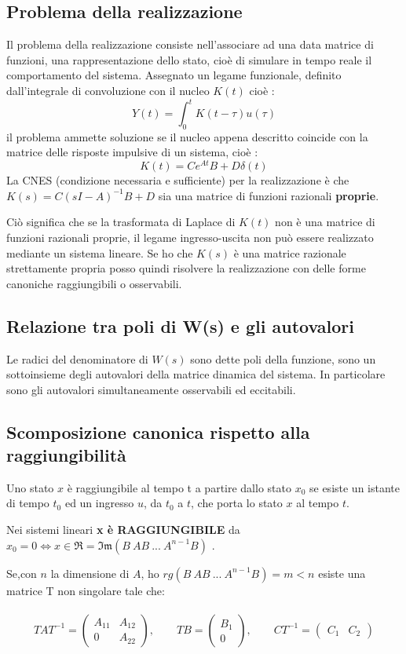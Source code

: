 \documentclass{article}
\begin{document}
\subsection{Problema della realizzazione}
Il problema della realizzazione consiste nell'associare ad una data matrice di funzioni,
una rappresentazione dello stato, cioè di simulare in tempo reale il comportamento del sistema.
Assegnato un legame funzionale, definito dall'integrale di convoluzione con il nucleo $K(t)$ cioè :
\[ Y(t)=\int_{0}^{t}K(t-\tau)u(\tau) \]
il problema ammette soluzione se il nucleo appena descritto coincide con la matrice delle risposte impulsive di un sistema, cioè :
\[ K(t)=Ce^{At}B+D\delta(t) \]
La CNES (condizione necessaria e sufficiente) per la realizzazione è che $K(s)=C(sI-A)^{-1}B+D$ sia una matrice di funzioni razionali \textbf{proprie}.

Ciò significa che se la trasformata di Laplace di $K(t)$ non è una matrice di funzioni razionali proprie,
il legame ingresso-uscita non può essere realizzato mediante un sistema lineare.
Se ho che $K(s)$ è una matrice razionale strettamente propria posso quindi risolvere la realizzazione con delle forme canoniche raggiungibili o osservabili.


\subsection{Relazione tra poli di W(s) e gli autovalori}

Le radici del denominatore di $W(s)$ sono dette poli della funzione, sono un sottoinsieme degli autovalori della matrice dinamica del sistema.
In particolare sono gli autovalori simultaneamente osservabili ed eccitabili.



\subsection{Scomposizione canonica rispetto alla raggiungibilità}
Uno stato $x$ è raggiungibile al tempo t a partire dallo stato $x_0$ se esiste un istante di tempo $t_0 $
ed un ingresso $u$, da $t_0$ a $t$, che porta lo stato $x$ al tempo $t$.

Nei sistemi lineari \textbf{x è RAGGIUNGIBILE} da
$x_0=0 \Longleftrightarrow x \in \mathfrak{R} = \mathfrak{Im}(B\ AB\ ...\ A^{n-1}B)$ .

Se,con $n$ la dimensione di $A$, ho $rg(B\ AB\ ...\ A^{n-1}B)=m<n$ esiste una matrice T non singolare tale che:\\\\
\[
TAT^{-1}= \begin{pmatrix}
A_{11} & A_{12}\\
0 & A_{22}
\end{pmatrix}
,
\hspace{2em}
TB = \begin{pmatrix}
B_1\\
0
\end{pmatrix}
,
\hspace{2em}
CT^{-1} = \begin{pmatrix}
C_1 & C_2
\end{pmatrix}
\]
\end{document}
